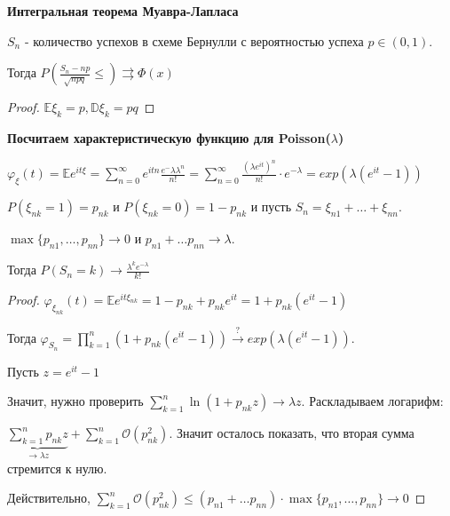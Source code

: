 \begin{consequence}
    \textbf{Интегральная теорема Муавра-Лапласа}

    $S_n$ - количество успехов в схеме Бернулли с вероятностью успеха $p \in (0, 1)$.

    Тогда $P \left( \frac{S_n - np}{\sqrt{npq}} \leqslant \right) \rightrightarrows \Phi (x)$
\end{consequence}

\begin{proof}
    $\mathbb{E} \xi_k = p, \mathbb{D} \xi_k = pq$
\end{proof}

\begin{example}
    \textbf{Посчитаем характеристическую функцию для Poisson($\lambda$)}

    $\varphi_{\xi} (t) = \mathbb{E} e^{i t \xi} = \sum_{n = 0}^\infty e^{itn} \frac{e^-\lambda \lambda^n}{n!} = \sum_{n = 0}^\infty \frac{(\lambda e^{it})^n}{n!} \cdot e^{-\lambda} = exp (\lambda (e^{it} - 1))$
\end{example}

\begin{theorem}
    $P(\xi_{nk} = 1) = p_{nk}$ и $P(\xi_{nk} = 0) = 1 - p_{nk}$ и пусть $S_n = \xi_{n1} + \ldots + \xi_{nn}$.

    $\max \{ p_{n1}, \ldots, p_{nn} \} \rightarrow 0$ и $p_{n1} + \ldots p_{nn} \rightarrow \lambda$.

    Тогда $P(S_n = k) \rightarrow \frac{\lambda^k e^{-\lambda}}{k!}$
\end{theorem}

\begin{proof}
    $\varphi_{\xi_{nk}} (t) = \mathbb{E} e^{it\xi_{nk}} = 1 - p_{nk} + p_{nk}e^{it} = 1 + p_{nk} (e^{it} - 1)$

    Тогда $\varphi_{S_n} = \prod_{k = 1}^n (1 + p_{nk} (e^{it} - 1)) \overset{?}{\rightarrow} exp (\lambda (e^{it} - 1)) $.

    Пусть $z = e^{it} - 1$

    Значит, нужно проверить $\sum_{k = 1}^n \ln (1 + p_{nk} z) \rightarrow \lambda z$. Раскладываем логарифм:

    $\underbrace{\sum_{k = 1}^n p_{nk} z}_{\rightarrow \lambda z} + \sum_{k = 1}^n \mathcal{O} (p_{nk}^2)$. Значит осталось показать, что вторая сумма стремится к нулю.

    Действительно, $\sum_{k = 1}^n \mathcal{O} (p_{nk}^2) \leqslant (p_{n1} + \ldots p_{nn}) \cdot \max \{ p_{n1}, \ldots, p_{nn} \}  \rightarrow 0$
\end{proof}

